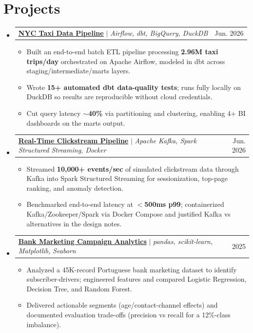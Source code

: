 \documentclass[letterpaper,11pt]{article}
\makeatletter
\newcommand{\resumeItem}[1]{
  \item\small{
    {#1 \vspace{-2pt}}
  }
}
\newcommand{\resumeProjectHeading}[2]{
    \item
    \begin{tabular*}{0.97\textwidth}{l@{\extracolsep{\fill}}r}
      \small#1 & #2 \\
    \end{tabular*}\vspace{-7pt}
}
\newcommand{\resumeSubHeadingListStart}{\begin{itemize}[leftmargin=0.15in, label={}]}
\newcommand{\resumeSubHeadingListEnd}{\end{itemize}}
\newcommand{\resumeItemListStart}{\begin{itemize}}
\newcommand{\resumeItemListEnd}{\end{itemize}\vspace{-5pt}}
\makeatother
\begin{document}
\section{Projects}
  \resumeSubHeadingListStart
    \resumeProjectHeading
      {\href{https://github.com/adityashirsatrao007/nyc-taxi-data-pipeline}{\textbf{NYC Taxi Data Pipeline}} $|$ \emph{Airflow, dbt, BigQuery, DuckDB}}{Jun. 2026}
      \resumeItemListStart
        \resumeItem{Built an end-to-end batch ETL pipeline processing \textbf{2.96M taxi trips/day} orchestrated on Apache Airflow, modeled in dbt across staging/intermediate/marts layers.}
        \resumeItem{Wrote \textbf{15+ automated dbt data-quality tests}; runs fully locally on DuckDB so results are reproducible without cloud credentials.}
        \resumeItem{Cut query latency \textbf{$\sim$40\%} via partitioning and clustering, enabling 4+ BI dashboards on the marts output.}
      \resumeItemListEnd
    \resumeProjectHeading
      {\href{https://github.com/adityashirsatrao007/real-time-clickstream}{\textbf{Real-Time Clickstream Pipeline}} $|$ \emph{Apache Kafka, Spark Structured Streaming, Docker}}{Jun. 2026}
      \resumeItemListStart
        \resumeItem{Streamed \textbf{10,000+ events/sec} of simulated clickstream data through Kafka into Spark Structured Streaming for sessionization, top-page ranking, and anomaly detection.}
        \resumeItem{Benchmarked end-to-end latency at \textbf{$<$500ms p99}; containerized Kafka/Zookeeper/Spark via Docker Compose and justified Kafka vs alternatives in the design notes.}
      \resumeItemListEnd
    \resumeProjectHeading
      {\href{https://github.com/adityashirsatrao007/bank-marketing-ml-case-study}{\textbf{Bank Marketing Campaign Analytics}} $|$ \emph{pandas, scikit-learn, Matplotlib, Seaborn}}{2025}
      \resumeItemListStart
        \resumeItem{Analyzed a 45K-record Portuguese bank marketing dataset to identify subscriber-drivers; engineered features and compared Logistic Regression, Decision Tree, and Random Forest.}
        \resumeItem{Delivered actionable segments (age/contact-channel effects) and documented evaluation trade-offs (precision vs recall for a 12\%-class imbalance).}
      \resumeItemListEnd
  \resumeSubHeadingListEnd

\end{document}
